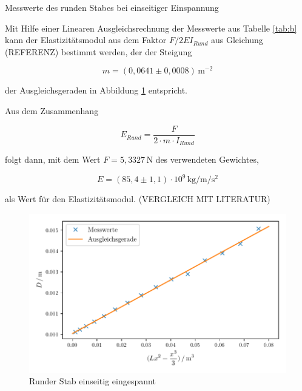 \begin{table}[H]
  \centering
  
  
  \caption{Messwerte des runden Stabes bei einseitiger Einspannung}
  \label{tab:b}
\end{table}

Mit Hilfe einer Linearen Ausgleichsrechnung der Messwerte
aus Tabelle \ref{tab:b} kann der Elastizitätsmodul aus dem 
Faktor $F/2EI_{Rund}$ aus Gleichung (REFERENZ) bestimmt werden, der der Steigung 

\begin{equation*}
  m=(0,0641 \pm 0,0008)\,\si{\meter\tothe{-2}}
\end{equation*}

\noindent der Ausgleichsgeraden
in Abbildung \ref{fig:a} entspricht.

Aus dem Zusammenhang 

\begin{equation}
  E_{Rund}=\frac{F}{2 \cdot m \cdot I_{Rund}}
\end{equation}

\noindent folgt dann, mit dem Wert $F=5,3327\,\si{\newton}$ des verwendeten Gewichtes,

\begin{equation*}
  E=(85,4 \pm 1,1) \cdot 10^{9} \,\si{\kilo\gram\per\meter\per\second\squared}
\end{equation*}

\noindent als Wert für den Elastizitätsmodul. (VERGLEICH MIT LITERATUR)


\begin{figure}[H]
  \centering
  \includegraphics{build/plot1.pdf}
  \caption{Runder Stab einseitig eingespannt}
  \label{fig:a}
\end{figure}



